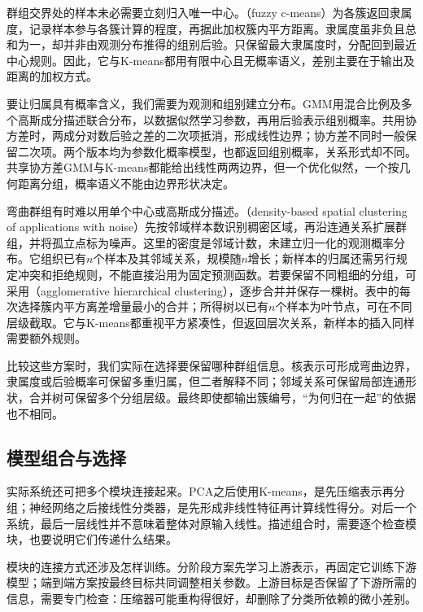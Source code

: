 群组交界处的样本未必需要立刻归入唯一中心。（fuzzy c-means）为各簇返回隶属度，记录样本参与各簇计算的程度，再据此加权簇内平方距离。隶属度虽非负且总和为一，却并非由观测分布推得的组别后验。只保留最大隶属度时，分配回到最近中心规则。因此，它与K-means都用有限中心且无概率语义，差别主要在于输出及距离的加权方式。

要让归属具有概率含义，我们需要为观测和组别建立分布。GMM用混合比例及多个高斯成分描述联合分布，以数据似然学习参数，再用后验表示组别概率。共用协方差时，两成分对数后验之差的二次项抵消，形成线性边界；协方差不同时一般保留二次项。两个版本均为参数化概率模型，也都返回组别概率，关系形式却不同。共享协方差GMM与K-means都能给出线性两两边界，但一个优化似然，一个按几何距离分组，概率语义不能由边界形状决定。

弯曲群组有时难以用单个中心或高斯成分描述。（density-based spatial clustering of applications with noise）先按邻域样本数识别稠密区域，再沿连通关系扩展群组，并将孤立点标为噪声。这里的密度是邻域计数，未建立归一化的观测概率分布。它组织已有$n$个样本及其邻域关系，规模随$n$增长；新样本的归属还需另行规定冲突和拒绝规则，不能直接沿用为固定预测函数。若要保留不同粗细的分组，可采用（agglomerative hierarchical clustering），逐步合并并保存一棵树。表中的每次选择簇内平方离差增量最小的合并；所得树以已有$n$个样本为叶节点，可在不同层级截取。它与K-means都重视平方紧凑性，但返回层次关系，新样本的插入同样需要额外规则。

比较这些方案时，我们实际在选择要保留哪种群组信息。核表示可形成弯曲边界，隶属度或后验概率可保留多重归属，但二者解释不同；邻域关系可保留局部连通形状，合并树可保留多个分组层级。最终即使都输出簇编号，“为何归在一起”的依据也不相同。

\FloatBarrier
\subsection{模型组合与选择}
\label{sec:models-combination-selection}

实际系统还可把多个模块连接起来。PCA之后使用K-means，是先压缩表示再分组；神经网络之后接线性分类器，是先形成非线性特征再计算线性得分。对后一个系统，最后一层线性并不意味着整体对原输入线性。描述组合时，需要逐个检查模块，也要说明它们传递什么结果。

模块的连接方式还涉及怎样训练。分阶段方案先学习上游表示，再固定它训练下游模型；端到端方案按最终目标共同调整相关参数。上游目标是否保留了下游所需的信息，需要专门检查：压缩器可能重构得很好，却删除了分类所依赖的微小差别。

